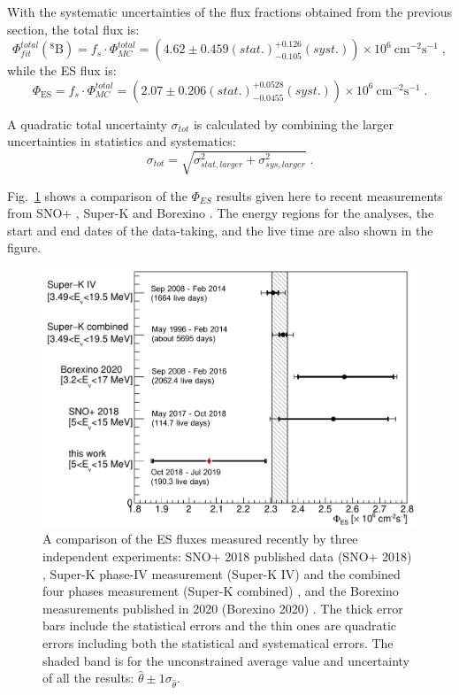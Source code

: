 {With the systematic uncertainties of the flux fractions obtained from the previous section, the total flux is:
\begin{equation}
{\Phi^{total}_{fit}(\mathrm{^8 B})=f_s\cdot \Phi^{total}_{MC}=(4.62\pm 0.459(stat.)^{+0.126}_{-0.105}(syst.))\times 10^6~\mathrm{cm^{-2}s^{-1}}}\; ,
\end{equation}
while the ES flux is:
\begin{equation}
\Phi_{\mathrm{ES}}=f_s\cdot \Phi^{total}_{MC}=(2.07\pm 0.206(stat.)^{+0.0528}_{-0.0455} (syst.))\times 10^6~\mathrm{cm^{-2}s^{-1}}\; .
\end{equation}

A quadratic total uncertainty $\sigma_{tot}$ is calculated by combining the larger uncertainties in statistics and systematics:
\begin{equation}
\sigma_{tot}=\sqrt{\sigma^2_{stat,larger}+\sigma^2_{sys,larger}}\; .
\end{equation}

Fig.~\ref{fig:ESfluxCompare} shows a comparison of the $\Phi_{ES}$ results given here to recent measurements from SNO+ \cite{anderson2019measurement}, Super-K \cite{abe2016solar} and Borexino \cite{agostini2020improved}. The energy regions for the analyses, the start and end dates of the data-taking, and the live time are also shown in the figure.
 
\begin{figure}[!htb]
	\centering
	\includegraphics[width=12cm]{ESfluxCompare.png}
	\caption[A comparison of the ES flux measured recently by three independent experiments.]{A comparison of the ES fluxes measured recently by three independent experiments: SNO+ 2018 published data (SNO+ 2018) \cite{anderson2019measurement}, Super-K phase-IV measurement (Super-K IV) and the combined four phases measurement (Super-K combined) \cite{abe2016solar}, and the Borexino measurements published in 2020 (Borexino 2020) \cite{agostini2020improved}. The thick error bars include the statistical errors and the thin ones are quadratic errors including both the statistical and systematical errors. The shaded band is for the unconstrained average value and uncertainty of all the results: $\hat \theta \pm 1\sigma_{\hat \theta}$.\label{fig:ESfluxCompare}}
\end{figure}

}
